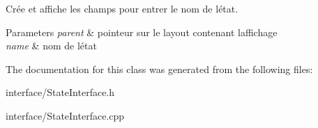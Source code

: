 Crée et affiche les champs pour entrer le nom de l\textquotesingle{}état. 


\begin{DoxyParams}{Parameters}
{\em parent} & pointeur sur le layout contenant l\textquotesingle{}affichage \\
\hline
{\em name} & nom de l\textquotesingle{}état \\
\hline
\end{DoxyParams}


The documentation for this class was generated from the following files\+:\begin{DoxyCompactItemize}
\item 
interface/State\+Interface.\+h\item 
interface/State\+Interface.\+cpp\end{DoxyCompactItemize}
